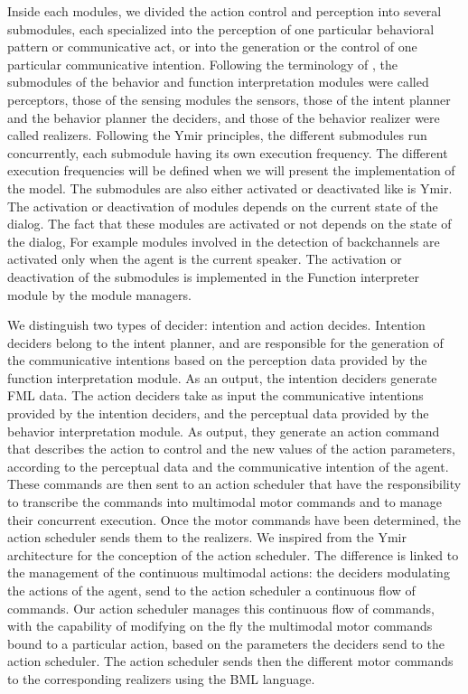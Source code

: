 Inside each modules, we divided the action control and perception into several submodules, each specialized into the perception of one particular behavioral pattern or communicative act, or into the generation or the control of one particular communicative intention. Following the terminology of \cite{thorisson_mind_1999}, the submodules of the behavior and function interpretation modules were called perceptors, those of the sensing modules the sensors, those of the intent planner and the behavior planner the deciders, and those of the behavior realizer were called realizers. 
Following the Ymir principles, the different submodules run concurrently, each submodule having its own execution frequency. The different execution frequencies will be defined when we will present the implementation of the model. The submodules are also either activated or deactivated like is Ymir.
The activation or deactivation of modules depends on the current state of the dialog. 
The fact that these modules are activated or not depends on the state of the dialog, 
For example modules involved in the detection of backchannels  are activated only when the agent is the current speaker. 
The activation or deactivation of the submodules is implemented in the Function interpreter module by the module managers. 

We distinguish two types of decider: intention and action decides. 
Intention deciders belong to the intent planner, and are responsible for the generation of the communicative intentions based on the perception data provided by the function interpretation module. As an output, the intention deciders generate FML data. 
The action deciders take as input the communicative intentions provided by the intention deciders, and the perceptual data provided by the behavior interpretation module. As output, they generate an action command that describes the action to control and the new values of the action parameters, according to the perceptual data and the communicative intention of the agent. 
These commands are then sent to an action scheduler that have the responsibility to transcribe the commands into multimodal motor commands and to manage their concurrent execution. Once the motor commands have been determined, the action scheduler sends them to the realizers. 
We inspired from the Ymir architecture for the conception of the action scheduler. The difference is linked to the management of the continuous multimodal actions: the deciders modulating the actions of the agent, send to the action scheduler a continuous flow of commands. Our action scheduler manages this continuous flow of commands, with the capability of modifying on the fly the multimodal motor commands bound to a particular action, based on the parameters the deciders send to the action scheduler. 
The action scheduler sends then the different motor commands to the corresponding realizers using the BML language. 

